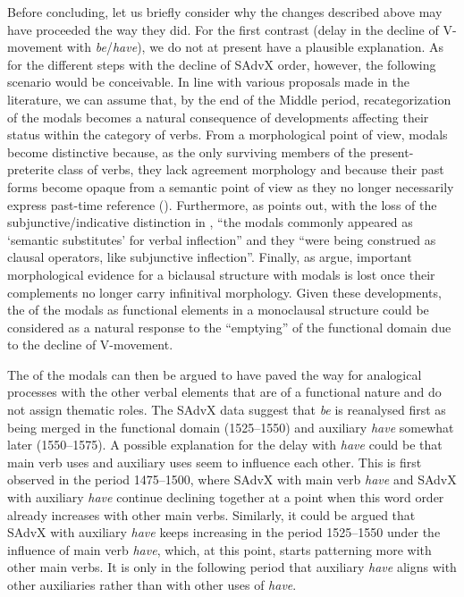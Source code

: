 \documentclass[output=paper]{langsci/langscibook}
\begin{document}
Before concluding, let us briefly consider why the changes described above may
have proceeded the way they did. For the first contrast (delay in the decline
of V-movement with \emph{be}/\emph{have}), we do not at present have a
plausible explanation. As for the different steps with the decline of SAdvX
order, however, the following scenario would be conceivable. In line with
various proposals made in the literature, we can assume that, by the end of the
Middle  period, recategorization of the modals becomes a natural
consequence of developments affecting their status within the category of
verbs. From a morphological point of view, modals become distinctive because,
as the only surviving members of the present-preterite class of verbs, they
lack \Tsg{} agreement morphology and because their past forms become opaque
from a semantic point of view as they no longer necessarily express past-time
reference (\citealt{Lightfoot1979,Lightfoot2006b}). Furthermore, as
\citet[42]{Roberts1985} points out, with the loss of the subjunctive/indicative
distinction in , “the modals commonly appeared as ‘semantic
substitutes’ for verbal inflection” and they “were being construed as clausal
operators, like subjunctive inflection”. Finally, as \citet{RobRou2003} argue,
important morphological evidence for a biclausal structure with modals is lost
once their complements no longer carry infinitival morphology. Given these
developments, the  of the modals as functional elements in a
monoclausal structure could be considered as a natural response to the
“emptying” of the functional domain due to the decline of V-movement.

The  of the modals can then be argued to have paved the way for
analogical processes with the other verbal elements that are of a functional
nature and do not assign thematic roles. The SAdvX data suggest that \emph{be}
is reanalysed first as being merged in the functional domain
(1525--1550) and auxiliary \emph{have} somewhat later (1550--1575). A
possible explanation for the delay with \emph{have} could be that main verb
uses and auxiliary uses seem to influence each other. This is first observed in
the period 1475--1500, where SAdvX with main verb \emph{have} and SAdvX with
auxiliary \emph{have} continue declining together at a point when this word
order already increases with other main verbs. Similarly, it could be argued
that SAdvX with auxiliary \emph{have} keeps increasing in the period
1525--1550 under the influence of main verb \emph{have}, which, at this point,
starts patterning more with other main verbs. It is only in the following
period that auxiliary \emph{have} aligns with other auxiliaries rather
than with other uses of \emph{have}.
\end{document}
